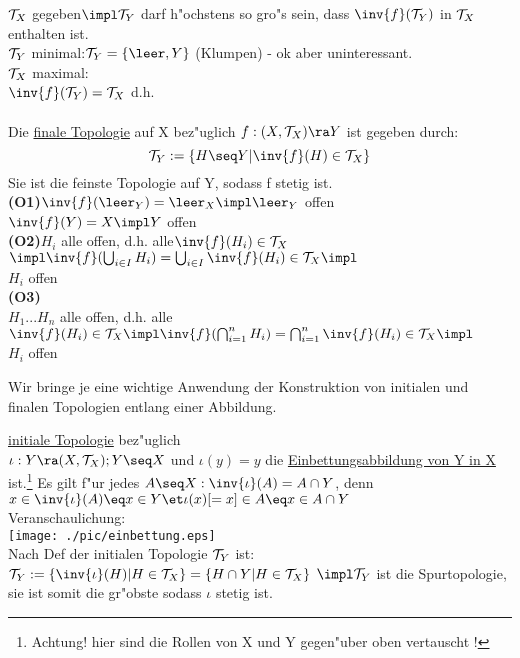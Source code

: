 \begin{minipage}[l]{7cm}
$\mathcal T_X$ gegeben$\impl\T_Y$ darf h"ochstens so gro"s sein, dass $\inv{f}(\T_Y)$ in $\mathcal T_X$ enthalten ist.\vspace*{0.3cm}\\
$\mathcal T_Y$ minimal:$\T_Y=\{\leer ,Y\}$ (Klumpen) - ok aber uninteressant.\vspace*{0.3cm}\\
$\mathcal T_X$ maximal:\\
$\inv{f}(\T_Y) = \T_X$ d.h.\\
\\
Die \ul{finale Topologie} auf X bez"uglich $f:(X,\T_X)\ra Y$ ist gegeben durch:\vspace*{-0.3cm}\\
$$\T_Y:=\{H\seq Y|\inv{f}(H)\in\T_X\}$$
Sie ist die feinste Topologie auf Y, sodass f stetig ist.\vspace*{0.3cm}\\
{\bf (O1)}$\inv{f}(\leer_Y )=\leer_X\impl \leer_Y$ offen\\
$\inv{f}(Y)= X\impl Y$ offen\\
{\bf (O2)}{\small $H_i$ alle offen, d.h. alle$\inv{f}(H_i)\in\T_X$\\
$\impl \inv{f}(\bigcup_{i\in I}H_i)=\bigcup_{i\in I}\inv{f}(H_i)\in\T_X\impl$\\
\hspace*{5.5cm}$H_i$ offen}\\
{\bf (O3)}\\
{\small $H_1... H_n$ alle offen, d.h. alle $\inv{f}(H_i)\in\T_X\\
\impl\inv{f}(\bigcap_{i=1}^nH_i)=\bigcap_{i=1}^n\inv{f}(H_i)\in\T_X\impl$\\
\hspace*{5.5cm}$H_i$ offen}
\end{minipage}
\newpage
Wir bringe je eine wichtige Anwendung der Konstruktion von initialen und finalen Topologien entlang einer Abbildung.\vspace*{1cm}\\
\begin{minipage}[l]{7cm}
\ul{initiale Topologie} bez"uglich\\
$\iota:Y\ra (X,\T_X); Y\seq X$ und $\iota (y)=y$ die \ul{Einbettungsabbildung von Y in X} ist.\footnote{Achtung! hier sind die Rollen von X und Y gegen"uber oben vertauscht !} Es gilt f"ur jedes $A\seq X:\\
\inv{\iota}(A)=A\cap Y$, denn $x\in \inv{\iota}(A)\eq\\
x\in Y\et \iota (x)[=x]\in A\eq x\in A\cap Y$\\
Veranschaulichung:\\
\texttt{[image: ./pic/einbettung.eps]}\\
Nach Def der initialen Topologie $\mathcal T_Y$ ist:\\
{\footnotesize $\T_Y:=\{\inv{\iota}(H)|H\in\T_X\}=\{H\cap Y|H\in\T_X\}$}
$\impl\T_Y$ ist die Spurtopologie, sie ist somit die gr"obste sodass $\iota$ stetig ist.
\end{minipage}\hspace*{0.5cm}
